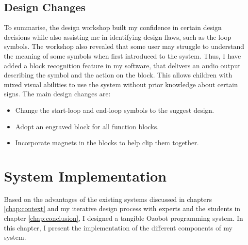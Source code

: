 \documentclass[oneside,%
                    author={Malak Hajji},
                    degree={BSc},
                    title={Designing An Accessible Computational Toolkit For Students},
                  subtitle={With Mixed Visual Abilities}]{dissertation}
\begin{document}
\section{Design Changes}
To summarise, the design workshop built my confidence in certain design decisions while also assisting me in identifying design flaws, such as the loop symbols. The workshop also revealed that some user may struggle to understand the meaning of some symbols when first introduced to the system. Thus, I have added a block recognition feature in my software, that delivers an audio output describing the symbol and the action on the block. This allows children with mixed visual abilities to use the system without prior knowledge about certain signs. The main design changes are:
\begin{itemize}
    \item Change the start-loop and end-loop symbols to the suggest design.
    \item Adopt an engraved block for all function blocks.
    \item Incorporate magnets in the blocks to help clip them together.
\end{itemize}






\chapter{System Implementation}
\label{chap:implementation}

Based on the advantages of the existing systems discussed in chapters \ref{chap:context} and my iterative design process with experts and the students in chapter \ref{chap:conclusion}, I designed a tangible Ozobot programming system. In this chapter, I present the implementation of the different components of my system.
\end{document}
